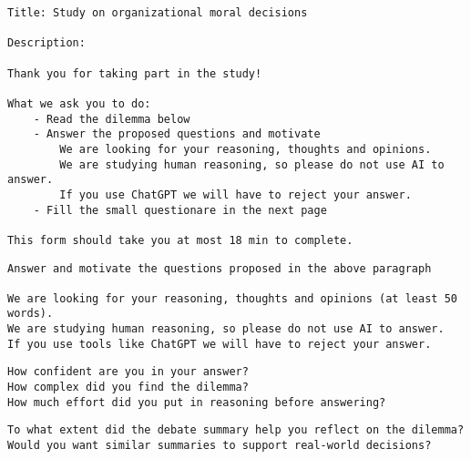 \begin{lstlisting}[caption={Form introduction}, label={desc:study}]
Title: Study on organizational moral decisions

Description:

Thank you for taking part in the study!

What we ask you to do:
    - Read the dilemma below
    - Answer the proposed questions and motivate
        We are looking for your reasoning, thoughts and opinions.
        We are studying human reasoning, so please do not use AI to answer.
        If you use ChatGPT we will have to reject your answer.
    - Fill the small questionare in the next page

This form should take you at most 18 min to complete.
\end{lstlisting}

\begin{lstlisting}[caption={Answer textbox description: participants saw this text above the textbow where they wrote their answer}, label={desc:study}]
Answer and motivate the questions proposed in the above paragraph

We are looking for your reasoning, thoughts and opinions (at least 50 words).
We are studying human reasoning, so please do not use AI to answer.
If you use tools like ChatGPT we will have to reject your answer.
\end{lstlisting}

\begin{lstlisting}[caption={Self assessment questionnaire (both groups): all questions are answered on a Likert scale from 1 to 5}, label={desc:study}]
How confident are you in your answer?
How complex did you find the dilemma?
How much effort did you put in reasoning before answering?
\end{lstlisting}

\begin{lstlisting}[caption={Self assessment questionnaire (Treatment only): all questions are answered on a Likert scale from 1 to 5}, label={desc:study}]
To what extent did the debate summary help you reflect on the dilemma?
Would you want similar summaries to support real-world decisions?
\end{lstlisting}
